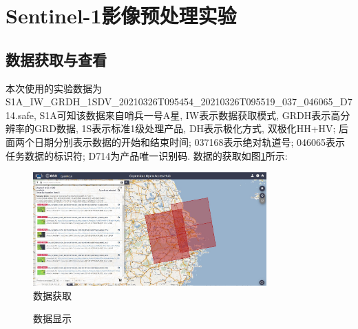 \section{Sentinel-1影像预处理实验}

\subsection{数据获取与查看}
本次使用的实验数据为S1A\_IW\_GRDH\_1SDV\_20210326T095454\_20210326T095519\_037\_046065\_D714.safe, S1A可知该数据来自哨兵一号A星, IW表示数据获取模式, GRDH表示高分辨率的GRD数据, 1S表示标准1级处理产品, DH表示极化方式, 双极化HH+HV; 后面两个日期分别表示数据的开始和结束时间; 037168表示绝对轨道号; 046065表示任务数据的标识符; D714为产品唯一识别码. 数据的获取如图\ref{fig:0301}所示:

\begin{figure}[!htbp]
    \centering
    \includegraphics[width=0.8\textwidth]{pic/chap0301.jpg}
    \caption{数据获取}
    \label{fig:0301}
\end{figure}

\begin{figure}[ht]
    \centering
    \qquad
    \caption{数据显示}
    \label{fig:0302}
\end{figure}


